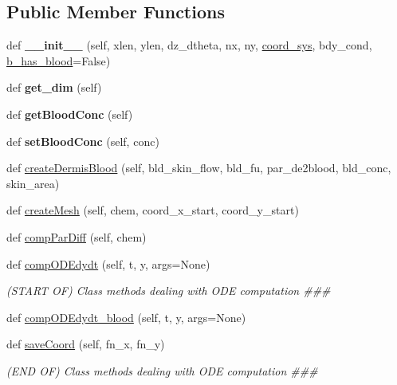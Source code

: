 \subsection*{Public Member Functions}
\begin{DoxyCompactItemize}
\item 
def {\bfseries \+\_\+\+\_\+init\+\_\+\+\_\+} (self, xlen, ylen, dz\+\_\+dtheta, nx, ny, \hyperlink{classcomp_1_1Comp_ae00e132d485d50acaf13977284fd9051}{coord\+\_\+sys}, bdy\+\_\+cond, \hyperlink{classdermis_1_1Dermis_a274c305d52c6527d75e28bf445a8bb14}{b\+\_\+has\+\_\+blood}=False)\hypertarget{classdermis_1_1Dermis_a16e9e07375f7e75224ed701b13fd5b85}{}\label{classdermis_1_1Dermis_a16e9e07375f7e75224ed701b13fd5b85}

\item 
def {\bfseries get\+\_\+dim} (self)\hypertarget{classdermis_1_1Dermis_a95e926b598eb3ff67d929d51b9845908}{}\label{classdermis_1_1Dermis_a95e926b598eb3ff67d929d51b9845908}

\item 
def {\bfseries get\+Blood\+Conc} (self)\hypertarget{classdermis_1_1Dermis_adc9a75ed6cc17598d5b3cabeed8c1fd1}{}\label{classdermis_1_1Dermis_adc9a75ed6cc17598d5b3cabeed8c1fd1}

\item 
def {\bfseries set\+Blood\+Conc} (self, conc)\hypertarget{classdermis_1_1Dermis_affb1984a8e46447d5b03df8eaaaeb923}{}\label{classdermis_1_1Dermis_affb1984a8e46447d5b03df8eaaaeb923}

\item 
def \hyperlink{classdermis_1_1Dermis_a3444c473db0af2a549683a991a5d1d54}{create\+Dermis\+Blood} (self, bld\+\_\+skin\+\_\+flow, bld\+\_\+fu, par\+\_\+de2blood, bld\+\_\+conc, skin\+\_\+area)
\item 
def \hyperlink{classdermis_1_1Dermis_a05d3cc24f6d0c9b2f3c515e3efde74bc}{create\+Mesh} (self, chem, coord\+\_\+x\+\_\+start, coord\+\_\+y\+\_\+start)
\item 
def \hyperlink{classdermis_1_1Dermis_a25e03ea4853eee1c106c958e9f06c907}{comp\+Par\+Diff} (self, chem)
\item 
def \hyperlink{classdermis_1_1Dermis_a330712627891b74dd3e216910ef913eb}{comp\+O\+D\+Edydt} (self, t, y, args=None)
\begin{DoxyCompactList}\small\item\em (S\+T\+A\+RT OF) Class methods dealing with O\+DE computation \#\#\# \end{DoxyCompactList}\item 
def \hyperlink{classdermis_1_1Dermis_aada0457a4b76448313ff9305df28d9f8}{comp\+O\+D\+Edydt\+\_\+blood} (self, t, y, args=None)
\item 
def \hyperlink{classdermis_1_1Dermis_a75925de5c1db9672a13fa9b409f79376}{save\+Coord} (self, fn\+\_\+x, fn\+\_\+y)\hypertarget{classdermis_1_1Dermis_a75925de5c1db9672a13fa9b409f79376}{}\label{classdermis_1_1Dermis_a75925de5c1db9672a13fa9b409f79376}

\begin{DoxyCompactList}\small\item\em (E\+ND OF) Class methods dealing with O\+DE computation \#\#\# \end{DoxyCompactList}\end{DoxyCompactItemize}
